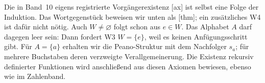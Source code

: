 Die in Band~10 eigens registrierte Vorgängerexistenz
[ax] ist selbst eine Folge der
Induktion. Das Wortgegenstück beweisen wir unten als
[thm]; ein zusätzliches W4
ist dafür nicht nötig. Auch \(W\ne\varnothing\) folgt schon aus
\(e\in W\). Das Alphabet \(A\) darf dagegen leer sein: Dann fordert W3
\(W=\{e\}\), weil es keinen Anfügungsschritt gibt. Für \(A=\{a\}\)
erhalten wir die Peano-Struktur mit dem Nachfolger \(s_a\); für mehrere
Buchstaben deren verzweigte Verallgemeinerung. Die Existenz rekursiv
definierter Funktionen wird anschließend aus diesen Axiomen bewiesen,
ebenso wie im Zahlenband.
